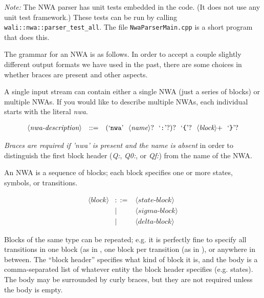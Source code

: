 \textsl{Note:} The NWA parser has unit tests embedded in the code. (It
does not use any unit test framework.) These tests can be run by
calling \texttt{wali::nwa::parser\_test\_all}. The file
\texttt{NwaParserMain.cpp} is a short program that does this.


The grammar for an NWA is as follows. In order to accept a couple
slightly different output formats we have used in the past, there are
some choices in whether braces are present and other aspects.


A single input stream can contain either a single NWA (just a series
of blocks) or multiple NWAs. If you would like to describe multiple
NWAs, each individual starts with the literal \textsl{nwa}.

\newenvironment{grammar}{\begin{equation*}\begin{array}{lrl}}{\end{array}\end{equation*}}
\newcommand{\nonterm}[1]{\ensuremath{\langle}\textit{#1}\ensuremath{\rangle}}
\newcommand{\term}[1]{\textrm`\texttt{#1}\textrm'}
\newcommand{\cfgsp}{\ \ }

\begin{grammar}
  \nonterm{nwa-description} & ::= & \left(\term{nwa}\cfgsp\nonterm{name}?\cfgsp\term{:}?\right)?\cfgsp\term{\{}?\cfgsp\nonterm{block}{+}\cfgsp\term{\}}?
\end{grammar}

\textsl{Braces are required if 'nwa' is present and the name is absent}
 in order to
 distinguish the first block header (\textsl{Q:}, \textsl{Q0:},
 or \textsl{Qf:}) from the name of the NWA.

An NWA is a sequence of blocks; each block specifies one or more
states, symbols, or transitions.

\begin{grammar}
  \nonterm{block} &  ::= & \nonterm{state-block} \\
                  &    | & \nonterm{sigma-block} \\
                  &    | & \nonterm{delta-block}
\end{grammar}

Blocks of the same type can be repeated; e.g. it is perfectly fine to
specify all transitions in one block (as in ,
one block per transition (as in ), or
anywhere in between. The ``block header'' specifies what kind of block
it is, and the body is a comma-separated list of whatever entity the
block header specifies (e.g. states). The body may be surrounded by
curly braces, but they are not required unless the body is empty.

